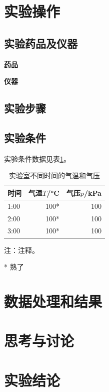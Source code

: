\documentclass[UTF8]{article}
\begin{document}
	\section{实验操作}
	\subsection{实验药品及仪器}
	\textbf{药品} 
	
	\textbf{仪器} 
	
	\subsection{实验步骤}
	
	\subsection{实验条件}
	实验条件数据见表\ref{tiaojian}。
	
	\begin{table}[htp]
		\centering
		\begin{threeparttable}
			\caption{实验室不同时间的气温和气压}\label{tiaojian}
			\begin{tabular} {lrr}
				\toprule
				时间 & 气温$T$/\si{\degreeCelsius} & 气压$p$/\si{\kilo\pascal}  \\
				\midrule
				1:00 & 100* & 100 \\
				2:00 & 100* & 100 \\
				3:00 & 100* & 100 \\
				\bottomrule
			\end{tabular}
		\small
		注：注释。
		\begin{tablenotes}
			\item[*] 熟了
		\end{tablenotes}
		\end{threeparttable}
	\end{table}
	
	
	\section{数据处理和结果}
	
	
	
	\section{思考与讨论}
	
	
	
	\section{实验结论}
	

	
	
	


	
\end{document}
